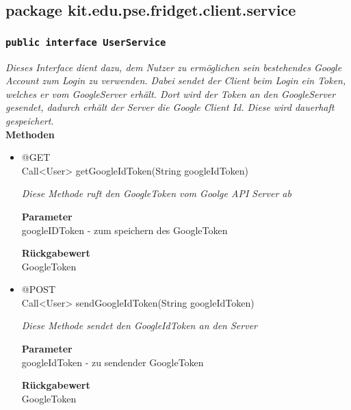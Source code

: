 \newpage


	\subsection{package kit.edu.pse.fridget.client.service}
	\subsubsection{\texttt{public interface UserService}}
\textit{Dieses Interface dient dazu, dem Nutzer zu ermöglichen sein bestehendes Google Account zum Login zu verwenden. Dabei sendet der Client beim Login ein Token, welches er vom GoogleServer erhält. Dort wird der Token an den GoogleServer gesendet, dadurch erhält der Server die Google Client Id. Diese wird dauerhaft gespeichert.}\\

	\textbf{Methoden} \\
		\begin{itemize}
		\item{@GET\\ Call<User> getGoogleIdToken(String googleIdToken)}

		\textit{Diese Methode ruft den GoogleToken vom Goolge API Server ab}

		\textbf{Parameter} \\
	googleIDToken - zum speichern des GoogleToken

		\textbf{Rückgabewert} \\
	GoogleToken

      \item{@POST\\ Call<User> sendGoogleIdToken(String googleIdToken)}

		\textit{Diese Methode sendet den GoogleIdToken an den Server}

		\textbf{Parameter} \\
		googleIdToken - zu sendender GoogleToken

		\textbf{Rückgabewert} \\
	GoogleToken

	 \end{itemize}

